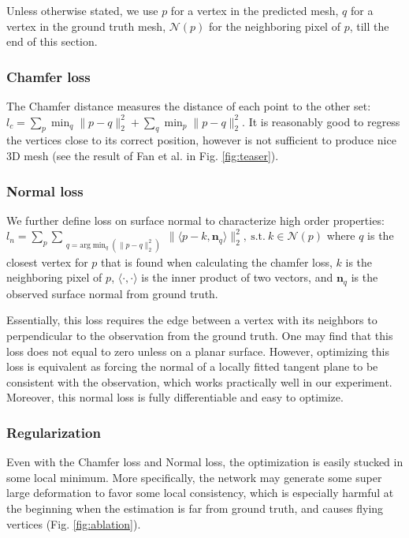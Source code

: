 \documentclass[runningheads]{llncs}
\def\bfn{\mathbf{n}}
\def\calN{\mathcal{N}}
\newcommand{\figref}[1]{Fig. \ref{#1}}
\begin{document}
Unless otherwise stated, we use $p$ for a vertex in the predicted mesh, $q$ for a vertex in the ground truth mesh, $\calN(p)$ for the neighboring pixel of $p$, till the end of this section.





\subsubsection{Chamfer loss}
The Chamfer distance measures the distance of each point to the other set:
$l_c = \sum_{p}\min_{q}\|p-q\|_2^2 + \sum_{q}\min_{p}\|p-q\|_2^2.$
It is reasonably good to regress the vertices close to its correct position, however is not sufficient to produce nice 3D mesh (see the result of Fan et al. \cite{FanSG16} in \figref{fig:teaser}).

\subsubsection{Normal loss}
We further define loss on surface normal to characterize high order properties:
$l_n=\sum_{p}\sum_{\substack{q=\mathrm{arg}\min_q(\|p-q\|_2^2)}}\|\langle p-k,\bfn_q\rangle\|_2^2, ~\mathrm{s.t}.~ k\in \calN(p)$
where $q$ is the closest vertex for $p$ that is found when calculating the chamfer loss, $k$ is the neighboring pixel of $p$, $\langle\cdot,\cdot\rangle$ is the inner product of two vectors, and $\bfn_q$ is the observed surface normal from ground truth.

Essentially, this loss requires the edge between a vertex with its neighbors to perpendicular to the observation from the ground truth. 
One may find that this loss does not equal to zero unless on a planar surface.
However, optimizing this loss is equivalent as forcing the normal of a locally fitted tangent plane to be consistent with the observation, which works practically well in our experiment.
Moreover, this normal loss is fully differentiable and easy to optimize.



\subsubsection{Regularization}
Even with the Chamfer loss and Normal loss, the optimization is easily stucked in some local minimum. More specifically, the network may generate some super large deformation to favor some local consistency, which is especially harmful at the beginning when the estimation is far from ground truth, and causes flying vertices (\figref{fig:ablation}).
\end{document}
